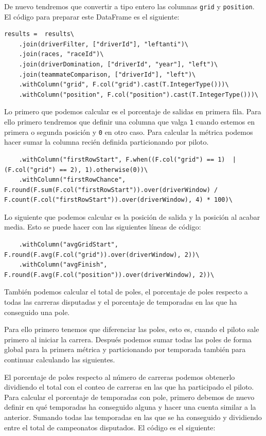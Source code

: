 \documentclass[12pt,twoside,titlepage]{report}
\begin{document}
De nuevo tendremos que convertir a tipo entero las columnas \texttt{grid} y \texttt{position}. El código para preparar este DataFrame es el siguiente:

\begin{lstlisting}
results =  results\
	.join(driverFilter, ["driverId"], "leftanti")\
	.join(races, "raceId")\
	.join(driverDomination, ["driverId", "year"], "left")\
	.join(teammateComparison, ["driverId"], "left")\
	.withColumn("grid", F.col("grid").cast(T.IntegerType()))\
	.withColumn("position", F.col("position").cast(T.IntegerType()))\
\end{lstlisting}

Lo primero que podemos calcular es el porcentaje de salidas en primera fila. Para ello primero tendremos que definir una columna que valga \texttt{1} cuando estemos en primera o segunda posición y \texttt{0} en otro caso. Para calcular la métrica podemos hacer sumar la columna recién definida particionando por piloto.

\begin{lstlisting}
	.withColumn("firstRowStart", F.when((F.col("grid") == 1)  | (F.col("grid") == 2), 1).otherwise(0))\
	.withColumn("firstRowChance", F.round(F.sum(F.col("firstRowStart")).over(driverWindow) / F.count(F.col("firstRowStart")).over(driverWindow), 4) * 100)\
\end{lstlisting}

Lo siguiente que podemos calcular es la posición de salida y la posición al acabar media. Esto se puede hacer con las siguientes líneas de código:

\begin{lstlisting}
	.withColumn("avgGridStart", F.round(F.avg(F.col("grid")).over(driverWindow), 2))\
	.withColumn("avgFinish", F.round(F.avg(F.col("position")).over(driverWindow), 2))\
\end{lstlisting}

También podemos calcular el total de poles, el porcentaje de poles respecto a todas las carreras disputadas y el porcentaje de temporadas en las que ha conseguido una pole.

Para ello primero tenemos que diferenciar las poles, esto es, cuando el piloto sale primero al iniciar la carrera. Después podemos sumar todas las poles de forma global para la primera métrica y particionando por temporada también para continuar calculando las siguientes.

El porcentaje de poles respecto al número de carreras podemos obtenerlo dividiendo el total con el conteo de carreras en las que ha participado el piloto. Para calcular el porcentaje de temporadas con pole, primero debemos de nuevo definir en qué temporadas ha conseguido alguna y hacer una cuenta similar a la anterior. Sumando todas las temporadas en las que se ha conseguido y dividiendo entre el total de campeonatos disputados. El código es el siguiente:
\end{document}
